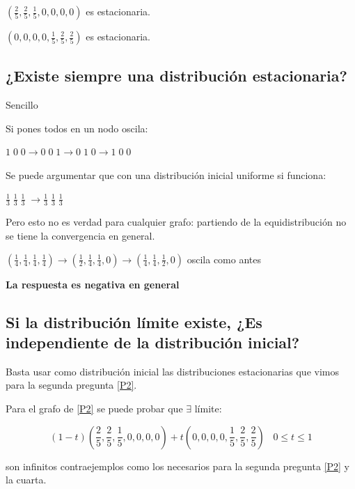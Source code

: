 $(\frac{2}{5},\frac{2}{5},\frac{1}{5}, 0, 0 , 0, 0)$ es estacionaria.

$(0, 0, 0, 0, \frac{1}{5}, \frac{2}{5}, \frac{2}{5})$ es estacionaria.


\subsection{¿Existe siempre una distribución estacionaria?}

\begin{example}{Sencillo}

	\begin{center}
		\centering
	\end{center}

	Si pones todos en un nodo oscila:

	$1\; 0\; 0 \rightarrow 0\; 0\; 1 \rightarrow 0\; 1\; 0 \rightarrow 1\; 0\; 0$

	Se puede argumentar que con una distribución inicial uniforme si funciona:

	$\frac{1}{3} \; \frac{1}{3} \; \frac{1}{3} \; \rightarrow \frac{1}{3} \; \frac{1}{3} \; \frac{1}{3} \; $

	Pero esto no es verdad para cualquier grafo: partiendo de la equidistribución no se tiene la convergencia en general.

	\begin{center}
		\centering
	\end{center}


	$(\frac{1}{4},\frac{1}{4},\frac{1}{4},\frac{1}{4}) \rightarrow (\frac{1}{2},\frac{1}{4},\frac{1}{4}, 0) \rightarrow (\frac{1}{4},\frac{1}{4},\frac{1}{2},0)$ oscila como antes

	\textbf{La respuesta es negativa en general}

\end{example}


\subsection {Si la distribución límite existe, ¿Es independiente de la distribución inicial?}


Basta usar como distribución inicial las distribuciones estacionarias que vimos para la segunda pregunta \ref{P2}.

\begin{obs}

Para el grafo de \ref{P2} se puede probar que $\exists$ límite:

$$(1-t)\left(\frac{2}{5},\frac{2}{5},\frac{1}{5},0,0,0,0\right) + t \left(0,0,0,0,\frac{1}{5},\frac{2}{5},\frac{2}{5}\right) \;\;\; 0 \leq t \leq 1 $$

son infinitos contraejemplos como los necesarios para la segunda pregunta \ref{P2} y la cuarta.

\end{obs}


